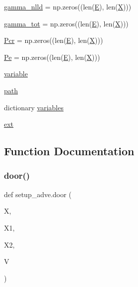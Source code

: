 \begin{DoxyCompactItemize}
\item 
\hyperlink{namespacesetup__adve_abc61e06be260322c425afb755c4ffeea}{gamma\+\_\+nlld} = np.\+zeros((len(\hyperlink{namespacesetup__adve_a924af0e190ae028ed71b0d7b9dd75fed}{E}), len(\hyperlink{namespacesetup__adve_ac58005e2708a29ed334e0542dd68d336}{X})))
\item 
\hyperlink{namespacesetup__adve_a779dfcd22b61630296fdbfe92d0f46d2}{gamma\+\_\+tot} = np.\+zeros((len(\hyperlink{namespacesetup__adve_a924af0e190ae028ed71b0d7b9dd75fed}{E}), len(\hyperlink{namespacesetup__adve_ac58005e2708a29ed334e0542dd68d336}{X})))
\item 
\hyperlink{namespacesetup__adve_abc561f3b00f4afc2c0a83624794e265c}{Pcr} = np.\+zeros((len(\hyperlink{namespacesetup__adve_a924af0e190ae028ed71b0d7b9dd75fed}{E}), len(\hyperlink{namespacesetup__adve_ac58005e2708a29ed334e0542dd68d336}{X})))
\item 
\hyperlink{namespacesetup__adve_aad148f2053f002e6876af30b7bc6528e}{Pe} = np.\+zeros((len(\hyperlink{namespacesetup__adve_a924af0e190ae028ed71b0d7b9dd75fed}{E}), len(\hyperlink{namespacesetup__adve_ac58005e2708a29ed334e0542dd68d336}{X})))
\item 
\hyperlink{namespacesetup__adve_a4ba70ed6e237e9d8f011a2696dea13c9}{variable}
\item 
\hyperlink{namespacesetup__adve_ac2bf3a357f936be55bdb980a7e93dfbf}{path}
\item 
dictionary \hyperlink{namespacesetup__adve_a4ebd374d49d05aea60925f94e1478ffa}{variables}
\item 
\hyperlink{namespacesetup__adve_a39a1b244b07d8a98961c220d41ca6d69}{ext}
\end{DoxyCompactItemize}


\subsection{Function Documentation}
\mbox{\label{namespacesetup__adve_a7780f17fc73f295cd92ee29dcfddc318}} 
\subsubsection{\texorpdfstring{door()}{door()}}
{\footnotesize\ttfamily def setup\+\_\+adve.\+door (\begin{DoxyParamCaption}\item[{}]{X,  }\item[{}]{X1,  }\item[{}]{X2,  }\item[{}]{V }\end{DoxyParamCaption})}

